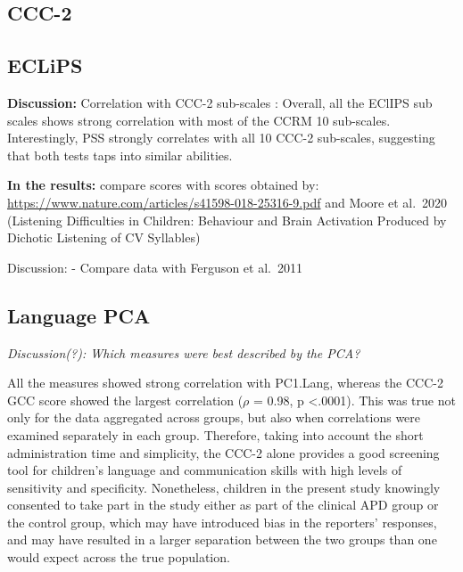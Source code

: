 \documentclass[a4paper, twoside]{templates/ociamthesis}
\begin{document}
\hypertarget{ccc-2-1}{%
\subsection{CCC-2}\label{ccc-2-1}}

\hypertarget{eclips-1}{%
\subsection{ECLiPS}\label{eclips-1}}

\textbf{Discussion:} Correlation with CCC-2 sub-scales \autocite{Barry2014}: Overall, all the EClIPS sub scales shows strong correlation with most of the CCRM 10 sub-scales. Interestingly, PSS strongly correlates with all 10 CCC-2 sub-scales, suggesting that both tests taps into similar abilities.

\textbf{In the results:} compare scores with scores obtained by: \url{https://www.nature.com/articles/s41598-018-25316-9.pdf} and Moore et al.~2020 (Listening Difficulties in Children: Behaviour and Brain Activation Produced by Dichotic Listening of CV Syllables)

Discussion: - Compare data with Ferguson et al.~2011

\hypertarget{language-pca}{%
\subsection{Language PCA}\label{language-pca}}

\begin{correction}
\emph{Discussion(?): Which measures were best described by the PCA?}

All the measures showed strong correlation with PC1.Lang, whereas the
CCC-2 GCC score showed the largest correlation (\(\rho\) = 0.98, p
\textless.0001). This was true not only for the data aggregated across
groups, but also when correlations were examined separately in each
group. Therefore, taking into account the short administration time and
simplicity, the CCC-2 alone provides a good screening tool for
children's language and communication skills with high levels of
sensitivity and specificity. Nonetheless, children in the present study
knowingly consented to take part in the study either as part of the
clinical APD group or the control group, which may have introduced bias
in the reporters' responses, and may have resulted in a larger
separation between the two groups than one would expect across the true
population.
\end{correction}
\end{document}
